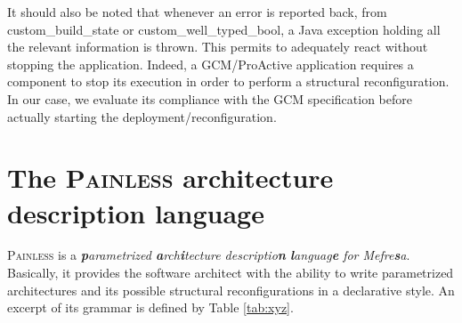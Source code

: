 		It should also be noted that whenever an error is reported back,
	from \textsf{custom\_build\_state} or \textsf{custom\_well\_typed\_bool},
	a Java exception holding all the relevant information is thrown. This
	permits to adequately react without stopping the application. Indeed,
	a GCM/ProActive application requires a component 
	to stop its execution in order to perform
	a structural reconfiguration. In our case, we evaluate
	its compliance with the \ac{GCM} specification before actually
	starting the deployment/reconfiguration.
		
	
\section{The \textsc{Painless} architecture description language}
\label{sec:painless}

	\textsc{Painless} is a \textit{\textbf{p}arametrized \textbf{a}rch\textbf{i}tecture 
	descriptio\textbf{n} \textbf{l}anguag\textbf{e} for \textsf{Mefre\textbf{s}a}}. Basically,
	it provides the software architect with the ability to write parametrized architectures
	and its possible structural reconfigurations in a declarative style. An excerpt of
	its grammar is defined by Table \ref{tab:xyz}.

